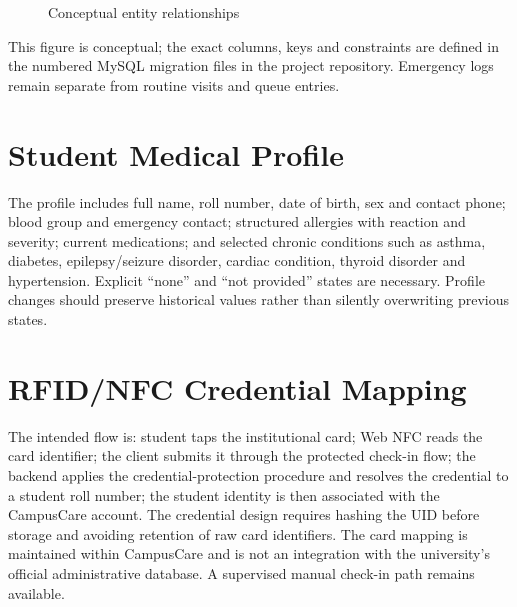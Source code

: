 \documentclass[a4paper,oneside,openany]{tietreport}
\begin{document}
\begin{figure}[!htbp]\centering
{}
\caption{Conceptual entity relationships}\label{fig:erd}
\end{figure}
This figure is conceptual; the exact columns, keys and constraints are defined in the numbered MySQL migration files in the project repository. Emergency logs remain separate from routine visits and queue entries.

\section{Student Medical Profile}
The profile includes full name, roll number, date of birth, sex and contact phone; blood group and emergency contact; structured allergies with reaction and severity; current medications; and selected chronic conditions such as asthma, diabetes, epilepsy/seizure disorder, cardiac condition, thyroid disorder and hypertension. Explicit ``none'' and ``not provided'' states are necessary. Profile changes should preserve historical values rather than silently overwriting previous states.

\section{RFID/NFC Credential Mapping}
The intended flow is: student taps the institutional card; Web NFC reads the card identifier; the client submits it through the protected check-in flow; the backend applies the credential-protection procedure and resolves the credential to a student roll number; the student identity is then associated with the CampusCare account. The credential design requires hashing the UID before storage and avoiding retention of raw card identifiers. The card mapping is maintained within CampusCare and is not an integration with the university's official administrative database. A supervised manual check-in path remains available.
\end{document}
